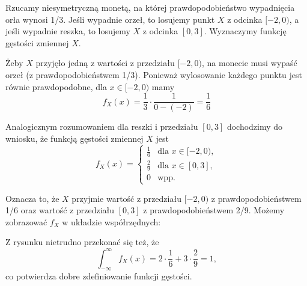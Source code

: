 \begin{example}
    Rzucamy niesymetryczną monetą, na której prawdopodobieństwo wypadnięcia orła wynosi 1/3. Jeśli wypadnie orzeł, to losujemy punkt $X$ z odcinka $[-2, 0)$, a jeśli wypadnie reszka, to losujemy $X$ z odcinka $[0, 3]$. Wyznaczymy funkcję gęstości zmiennej $X$.

    Żeby $X$ przyjęło jedną z wartości z przedziału $[-2, 0)$, na monecie musi wypaść orzeł (z prawdopodobieństwem 1/3). Ponieważ wylosowanie każdego punktu jest równie prawdopodobne, dla $x \in [-2, 0)$ mamy
    $$f_X(x) = \frac{1}{3} \cdot \frac{1}{0 - (-2)} = \frac{1}{6}$$

    Analogicznym rozumowaniem dla reszki i przedziału $[0, 3]$ dochodzimy do wniosku, że funkcją gęstości zmiennej $X$ jest
    $$
    f_X(x) = \begin{cases}
        \frac{1}{6} & \text{dla } x \in [-2, 0), \\
        \frac{2}{9} & \text{dla } x \in [0, 3], \\
        0 & \text{wpp.}
    \end{cases}
    $$

    Oznacza to, że $X$ przyjmie wartość z przedziału $[-2, 0)$ z prawdopodobieństwem 1/6 oraz wartość z przedziału $[0, 3]$ z prawdopodobieństwem 2/9. Możemy zobrazować $f_X$ w układzie współrzędnych:
    \begin{center}
    \end{center}

    Z rysunku nietrudno przekonać się też, że
    $$\int_{-\infty}^{\infty} f_X(x) = 2 \cdot \frac{1}{6} + 3 \cdot \frac{2}{9} = 1,$$
    co potwierdza dobre zdefiniowanie funkcji gęstości.
\end{example}

